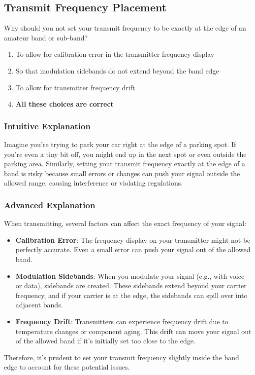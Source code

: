 \subsection{Transmit Frequency Placement}
\label{T1B09}

\begin{tcolorbox}[colback=gray!10!white,colframe=black!75!black,title=T1B09]
Why should you not set your transmit frequency to be exactly at the edge of an amateur band or sub-band?
\begin{enumerate}[label=\Alph*,noitemsep]
    \item To allow for calibration error in the transmitter frequency display
    \item So that modulation sidebands do not extend beyond the band edge
    \item To allow for transmitter frequency drift
    \item \textbf{All these choices are correct}
\end{enumerate}
\end{tcolorbox}

\subsubsection*{Intuitive Explanation}
Imagine you're trying to park your car right at the edge of a parking spot. If you're even a tiny bit off, you might end up in the next spot or even outside the parking area. Similarly, setting your transmit frequency exactly at the edge of a band is risky because small errors or changes can push your signal outside the allowed range, causing interference or violating regulations.

\subsubsection*{Advanced Explanation}
When transmitting, several factors can affect the exact frequency of your signal:
\begin{itemize}
    \item \textbf{Calibration Error}: The frequency display on your transmitter might not be perfectly accurate. Even a small error can push your signal out of the allowed band.
    \item \textbf{Modulation Sidebands}: When you modulate your signal (e.g., with voice or data), sidebands are created. These sidebands extend beyond your carrier frequency, and if your carrier is at the edge, the sidebands can spill over into adjacent bands.
    \item \textbf{Frequency Drift}: Transmitters can experience frequency drift due to temperature changes or component aging. This drift can move your signal out of the allowed band if it's initially set too close to the edge.
\end{itemize}
Therefore, it's prudent to set your transmit frequency slightly inside the band edge to account for these potential issues.